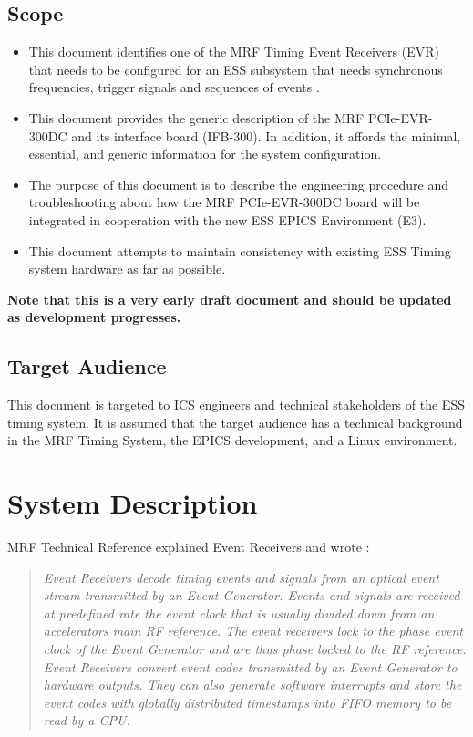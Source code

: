 \documentclass[11pt
  , a4paper
  , article
  , oneside
  , showtrims
]{memoir}
\begin{document}
\section{Scope}
\begin{itemize}
\item This document identifies one of the MRF Timing Event Receivers (EVR) that needs to be configured for an ESS subsystem that needs synchronous frequencies, trigger signals and sequences of events \cite{MRFEVENTSYSTEMDC}.
\item This document provides the generic description of the MRF PCIe-EVR-300DC and its interface board (IFB-300). In addition, it affords the minimal, essential, and generic information for the system configuration.
\item The purpose of this document is to describe the engineering procedure and troubleshooting about how the MRF PCIe-EVR-300DC board will be integrated in cooperation with the new ESS EPICS Environment (E3).
\item This document attempts to maintain consistency with existing ESS Timing system hardware as far as possible.
\end{itemize}
\textbf{Note that this is a very early draft document and should be updated as development progresses.}


\section{Target Audience}
This document is targeted to ICS engineers and technical stakeholders of the ESS timing system. It is assumed that the target audience has a technical background in the MRF Timing System, the EPICS development, and a Linux environment.



\chapter{System Description}
MRF Technical Reference \citep[see][p45]{MRFEVENTSYSTEMDC} explained Event Receivers and wrote :
\blockquote{\textit{Event Receivers decode timing events and signals from an optical event stream transmitted by an Event Generator. Events and signals are received at predefined rate the event clock that is usually divided down from an accelerators main RF reference. The event receivers lock to the phase event clock of the Event Generator and are thus phase locked to the RF reference. Event Receivers convert event codes transmitted by an Event Generator to hardware outputs. They can also generate software interrupts and store the event codes with globally distributed timestamps into FIFO memory to be read by a CPU.}}
\end{document}
